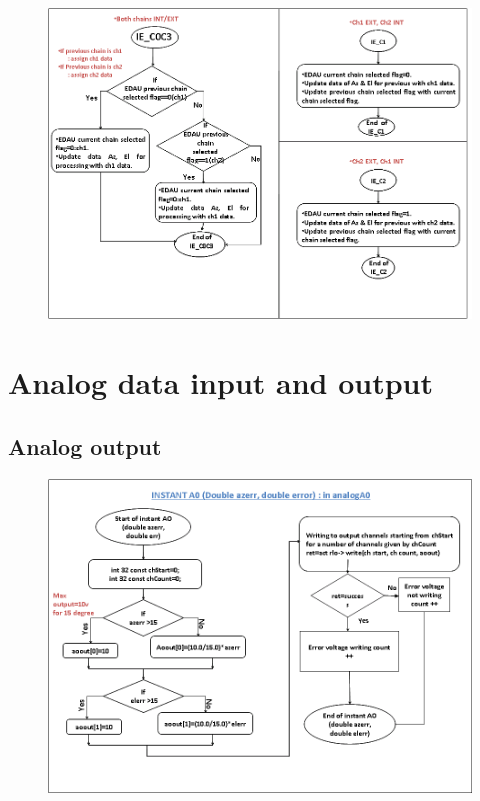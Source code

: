 \begin{figure}[H]
	\centering
	\includegraphics[width=\linewidth]{./FlowCharts/PngFlowCharts/EDAU9.png}
\end{figure}




\section{Analog data input and output}
\subsection{Analog output}
\begin{figure}[H]
	\centering
	\includegraphics[width=\linewidth]{./FlowCharts/PngFlowCharts/TCP10.png}
\end{figure}
